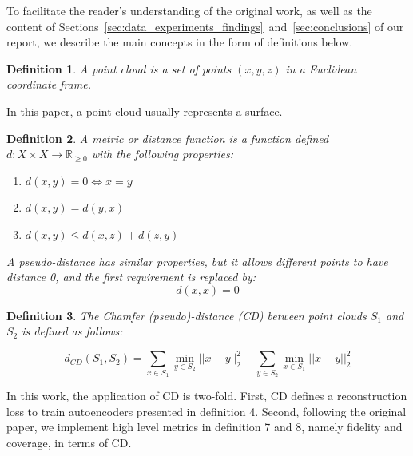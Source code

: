 \documentclass[12pt]{article}
\newtheorem{definition}{Definition}
\begin{document}
    To facilitate the reader's understanding of the original work, as well as the content of Sections~\ref{sec:data_experiments_findings}~and~\ref{sec:conclusions} of our report, we describe the main concepts in the form of definitions below.

    \begin{definition}
        \normalfont
        A \emph{point cloud} is a set of points $(x, y, z)$ in a Euclidean coordinate frame.
    \end{definition}

    In this paper, a point cloud usually represents a surface.

    \begin{definition}
        \normalfont
        A \emph{metric} or \emph{distance function} is a function defined
        $d: X \times X \to \mathbb{R}_{\geq 0}$
        with the following properties:

        \begin{enumerate}
            \item $d(x,y) = 0 \Leftrightarrow x = y$
            \item $d(x,y) = d(y,x)$
            \item $d(x,y) \leq d(x,z) + d(z,y)$
        \end{enumerate}

        A \emph{pseudo-distance} has similar properties, but it allows different points to have distance 0, and the first requirement is replaced by:
        \[d(x,x) = 0\]
    \end{definition}

    \begin{definition}
        \normalfont
        The \emph{Chamfer (pseudo)-distance (CD)} between point clouds $S_1$ and $S_2$ is defined as follows:

        \[d_{CD}(S_{1}, S_{2}) = \sum_{x \in S_{1}} \min _{y \in S_{2}} || x - y||_{2}^{2} +
        \sum_{y \in S_{2}} \min_{x \in S_{1}} ||x - y||_{2}^{2}\]
    \end{definition}


    In this work, the application of CD is two-fold. First, CD defines a reconstruction loss to train autoencoders presented in definition 4. Second, following the original paper, we implement high level metrics in definition 7 and 8, namely fidelity and coverage, in terms of CD.
\end{document}
